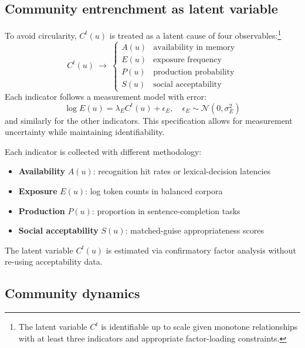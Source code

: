 \documentclass[12pt]{article}
\begin{document}
\subsection{Community entrenchment as latent variable}

To avoid circularity, $C^{t}(u)$ is treated as a latent cause of four observables:\footnote{The latent variable $C^{t}$ is identifiable up to scale given monotone relationships with at least three indicators and appropriate factor-loading constraints.}
\begin{equation}
C^{t}(u)\ \longrightarrow\ 
\begin{cases}
A(u) & \text{availability in memory}\\
E(u) & \text{exposure frequency}\\
P(u) & \text{production probability}\\
S(u) & \text{social acceptability}
\end{cases}
\end{equation}
Each indicator follows a measurement model with error:
\begin{equation}
\log E(u) = \lambda_E C^{t}(u) + \epsilon_E, \quad \epsilon_E \sim \mathcal{N}(0,\sigma_E^{2})
\end{equation}
and similarly for the other indicators. This specification allows for measurement uncertainty while maintaining identifiability.

Each indicator is collected with different methodology:
\begin{itemize}
  \item \textbf{Availability} $A(u)$: recognition hit rates or lexical-decision latencies
  \item \textbf{Exposure} $E(u)$: log token counts in balanced corpora
  \item \textbf{Production} $P(u)$: proportion in sentence-completion tasks
  \item \textbf{Social acceptability} $S(u)$: matched-guise appropriateness scores
\end{itemize}

The latent variable $C^{t}(u)$ is estimated via confirmatory factor analysis without re-using acceptability data.

\subsection{Community dynamics}
\end{document}
